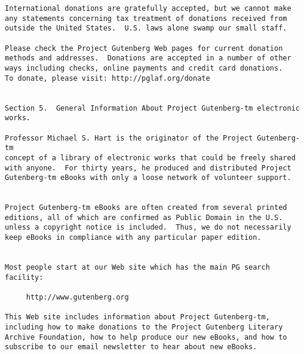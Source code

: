 \begin{Verbatim}[fontsize=\footnotesize]
International donations are gratefully accepted, but we cannot make
any statements concerning tax treatment of donations received from
outside the United States.  U.S. laws alone swamp our small staff.

Please check the Project Gutenberg Web pages for current donation
methods and addresses.  Donations are accepted in a number of other
ways including checks, online payments and credit card donations.
To donate, please visit: http://pglaf.org/donate


Section 5.  General Information About Project Gutenberg-tm electronic
works.

Professor Michael S. Hart is the originator of the Project Gutenberg-tm
concept of a library of electronic works that could be freely shared
with anyone.  For thirty years, he produced and distributed Project
Gutenberg-tm eBooks with only a loose network of volunteer support.


Project Gutenberg-tm eBooks are often created from several printed
editions, all of which are confirmed as Public Domain in the U.S.
unless a copyright notice is included.  Thus, we do not necessarily
keep eBooks in compliance with any particular paper edition.


Most people start at our Web site which has the main PG search facility:

     http://www.gutenberg.org

This Web site includes information about Project Gutenberg-tm,
including how to make donations to the Project Gutenberg Literary
Archive Foundation, how to help produce our new eBooks, and how to
subscribe to our email newsletter to hear about new eBooks.


\end{Verbatim}



